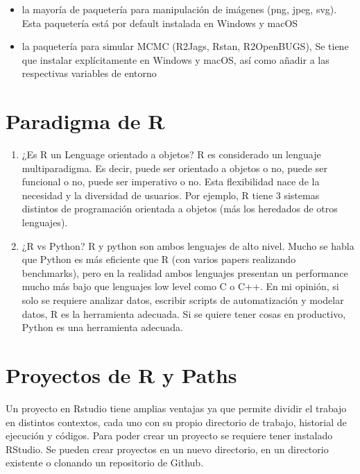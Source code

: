\documentclass[]{book}
\begin{document}
\begin{itemize}
\item
  la mayoría de paquetería para manipulación de imágenes (png, jpeg, svg). Esta paquetería está por default instalada en Windows y macOS
\item
  la paquetería para simular MCMC (R2Jags, Rstan, R2OpenBUGS), Se tiene que instalar explícitamente en Windows y macOS, así como añadir a las respectivas variables de entorno
\end{itemize}

\hypertarget{paradigma-de-r}{%
\section{Paradigma de R}\label{paradigma-de-r}}

\begin{enumerate}
\def\labelenumi{\arabic{enumi}.}
\item
  ¿Es R un Lenguage orientado a objetos? R es considerado un lenguaje multiparadigma. Es decir, puede ser orientado a objetos o no, puede ser funcional o no, puede ser imperativo o no. Esta flexibilidad nace de la necesidad y la diversidad de usuarios. Por ejemplo, R tiene 3 sistemas distintos de programación orientada a objetos (más los heredados de otros lenguajes).
\item
  ¿R vs Python?
  R y python son ambos lenguajes de alto nivel. Mucho se habla que Python es más eficiente que R (con varios papers realizando benchmarks), pero en la realidad ambos lenguajes presentan un performance mucho más bajo que lenguajes low level como C o C++. En mi opinión, si solo se requiere analizar datos, escribir scripts de automatización y modelar datos, R es la herramienta adecuada. Si se quiere tener cosas en productivo, Python es una herramienta adecuada.
\end{enumerate}

\hypertarget{proyectos-de-r-y-paths}{%
\section{Proyectos de R y Paths}\label{proyectos-de-r-y-paths}}

Un proyecto en Rstudio tiene amplias ventajas ya que permite dividir el trabajo en distintos contextos, cada uno con su propio directorio de trabajo, historial de ejecución y códigos. Para poder crear un proyecto se requiere tener instalado RStudio. Se pueden crear proyectos en un nuevo directorio, en un directorio existente o clonando un repositorio de Github.
\end{document}
